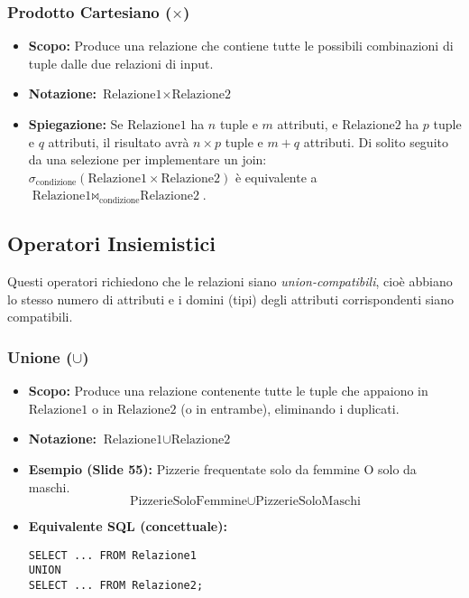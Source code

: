 \subsubsection{\texorpdfstring{Prodotto Cartesiano ($\times$)}{Prodotto Cartesiano (x)}}
\begin{itemize}
    \item \textbf{Scopo:} Produce una relazione che contiene tutte le possibili combinazioni di tuple dalle due relazioni di input.
    \item \textbf{Notazione:} $\text{Relazione1} \times \text{Relazione2}$
    \item \textbf{Spiegazione:} Se $\text{Relazione1}$ ha $n$ tuple e $m$ attributi, e $\text{Relazione2}$ ha $p$ tuple e $q$ attributi, il risultato avrà $n \times p$ tuple e $m+q$ attributi. Di solito seguito da una selezione per implementare un join: $\sigma_{\text{condizione}}(\text{Relazione1} \times \text{Relazione2})$ è equivalente a $\text{Relazione1} \Join_{\text{condizione}} \text{Relazione2}$.
\end{itemize}

\subsection{Operatori Insiemistici}
Questi operatori richiedono che le relazioni siano \textit{union-compatibili}, cioè abbiano lo stesso numero di attributi e i domini (tipi) degli attributi corrispondenti siano compatibili.

\subsubsection{\texorpdfstring{Unione ($\cup$)}{Unione (unione)}}
\begin{itemize}
    \item \textbf{Scopo:} Produce una relazione contenente tutte le tuple che appaiono in $\text{Relazione1}$ o in $\text{Relazione2}$ (o in entrambe), eliminando i duplicati.
    \item \textbf{Notazione:} $\text{Relazione1} \cup \text{Relazione2}$
    \item \textbf{Esempio (Slide 55):} Pizzerie frequentate solo da femmine O solo da maschi.
          \[ \text{PizzerieSoloFemmine} \cup \text{PizzerieSoloMaschi} \]
    \item \textbf{Equivalente SQL (concettuale):}
\begin{verbatim}
SELECT ... FROM Relazione1
UNION
SELECT ... FROM Relazione2;
\end{verbatim}
\end{itemize}

